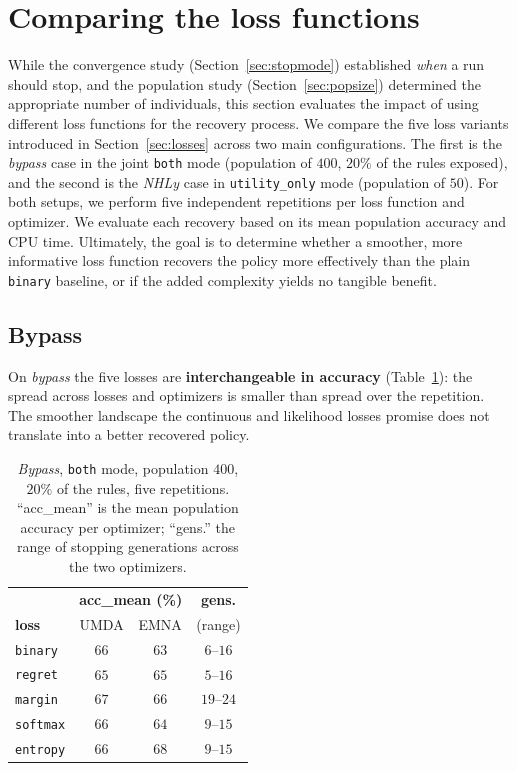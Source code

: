 \newpage
\section{Comparing the loss functions}
\label{sec:fitness}

While the convergence study (Section~\ref{sec:stopmode}) established \emph{when} a run should stop, and the population study (Section~\ref{sec:popsize}) determined the appropriate number of individuals, this section evaluates the impact of using different loss functions for the recovery process. We compare the five loss variants introduced in Section~\ref{sec:losses} across two main configurations. The first is the \emph{bypass} case in the joint \texttt{both} mode (population of $400$, $20\%$ of the rules exposed), and the second is the \emph{NHLy} case in \texttt{utility\_only} mode (population of $50$). For both setups, we perform five independent repetitions per loss function and optimizer. We evaluate each recovery based on its mean population accuracy and CPU time. Ultimately, the goal is to determine whether a smoother, more informative loss function recovers the policy more effectively than the plain \texttt{binary} baseline, or if the added complexity yields no tangible benefit.

\subsection{Bypass}
\label{sec:fitness-bypass}

On \emph{bypass} the five losses are \textbf{interchangeable in accuracy}
(Table~\ref{tab:fitness-bypass}): the spread across losses and optimizers is
smaller than spread over the repetition. The smoother landscape the continuous and likelihood losses promise does not translate into a
better recovered policy.

\begin{table}[h!]
\centering
\begin{tabular}{lccc}
\toprule
 & \multicolumn{2}{c}{\textbf{acc\_mean (\%)}} & \textbf{gens.}\\
\textbf{loss} & UMDA & EMNA & (range)\\
\midrule
\texttt{binary}  & $66$ & $63$ & $6$--$16$\\
\texttt{regret}  & $65$ & $65$ & $5$--$16$\\
\texttt{margin}  & $67$ & $66$ & $19$--$24$\\
\texttt{softmax} & $66$ & $64$ & $9$--$15$\\
\texttt{entropy} & $66$ & $68$ & $9$--$15$\\
\bottomrule
\end{tabular}
\caption{\emph{Bypass}, \texttt{both} mode, population $400$, $20\%$ of the rules, five repetitions. ``acc\_mean'' is the mean population accuracy per
optimizer; ``gens.'' the range of stopping generations across the two optimizers.
}
\label{tab:fitness-bypass}
\end{table}

